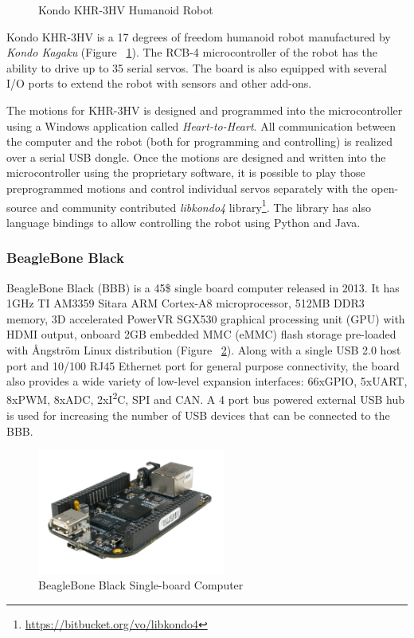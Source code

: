 \documentclass[12pt]{article}
\newcommand\mysubsubsection[1]{\subsubsection{#1}}
\numberwithin{equation}{section}
\numberwithin{figure}{section}
\numberwithin{table}{section}
\begin{document}
{\begin{figure}[ht]
        \caption{Kondo KHR-3HV Humanoid Robot}
        \label{fig:kondo}
    \end{figure}
    Kondo KHR-3HV is a 17 degrees of freedom humanoid robot manufactured by
    \emph{Kondo Kagaku} (Figure ~\ref{fig:kondo}). The RCB-4 microcontroller of the robot has the
    ability to drive up to 35 serial servos. The board is also equipped with
    several I/O ports to extend the robot with sensors and other add-ons.
}
\par{
    The motions for KHR-3HV is designed and programmed into the microcontroller
    using a Windows application called \emph{Heart-to-Heart}. All communication
    between the computer and the robot (both for programming and controlling)
    is realized over a serial USB dongle. Once the motions are designed and written
    into the microcontroller using the proprietary software,
    it is possible to play those preprogrammed motions and
    control individual servos separately with the open-source and community
    contributed \emph{libkondo4} library\footnote{\url{https://bitbucket.org/vo/libkondo4}}.
    The library has also language bindings to allow controlling the robot using Python and Java.
}

\mysubsubsection{BeagleBone Black}

\par{
    BeagleBone Black (BBB) is a 45\$ single board computer released in 2013. It has 1GHz TI AM3359 Sitara ARM Cortex-A8 microprocessor,
    512MB DDR3 memory, 3D accelerated PowerVR SGX530 graphical processing unit (GPU) with HDMI output, onboard 2GB embedded MMC (eMMC)
    flash storage pre-loaded with Ångström Linux distribution (Figure ~\ref{fig:bbb}). Along with a single USB 2.0 host port and 10/100 RJ45 Ethernet port for
    general purpose connectivity, the board also provides a wide variety of low-level expansion interfaces:
    66xGPIO, 5xUART, 8xPWM, 8xADC, 2xI\textsuperscript{2}C, SPI and CAN. A 4 port bus powered external USB hub is used for
    increasing the number of USB devices that can be connected to the BBB.
}

\begin{figure}[ht]
    \centering
    \includegraphics[width=0.55\textwidth]{images/bbb}
    \caption{BeagleBone Black Single-board Computer}
    \label{fig:bbb}
\end{figure}
\end{document}
